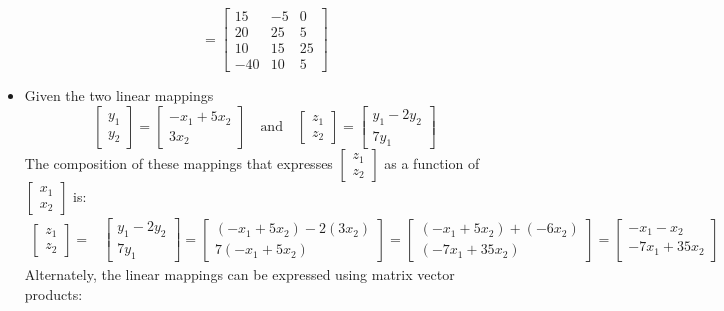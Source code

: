 \documentclass{article}
\begin{document}
\begin{itemize}
\[= \begin{bmatrix} 15 & -5 & 0 \\ 20 & 25 & 5 \\ 10 & 15 & 25 \\ -40 & 10 & 5 \end{bmatrix}\]
\item Given the two linear mappings
\[\begin{bmatrix} y_1 \\ y_2 \end{bmatrix} = \begin{bmatrix} -x_1 + 5x_2 \\ 3x_2 \end{bmatrix} \quad\text{and}\quad \begin{bmatrix} z_1 \\ z_2 \end{bmatrix} = \begin{bmatrix} y_1 - 2y_2 \\ 7y_1 \end{bmatrix}\]
The composition of these mappings that expresses \(\begin{bmatrix} z_1 \\ z_2 \end{bmatrix}\) as a function of \(\begin{bmatrix} x_1 \\ x_2 \end{bmatrix}\) is:
\begin{align*}
\begin{bmatrix} 
z_1 \\ z_2  
\end{bmatrix} 
= & \begin{bmatrix} y_1 - 2y_2 \\ 7y_1 \end{bmatrix}
= \begin{bmatrix} (-x_1 + 5x_2) - 2(3x_2) \\ 7(-x_1 + 5x_2) \end{bmatrix} 
= \begin{bmatrix} (-x_1 + 5x_2) + (-6x_2) \\ (-7x_1 + 35x_2) \end{bmatrix} 
= \begin{bmatrix} -x_1 - x_2 \\ -7x_1 + 35x_2 \end{bmatrix}
\end{align*}
Alternately, the linear mappings can be expressed using matrix vector products:

\end{itemize}
\end{document}
